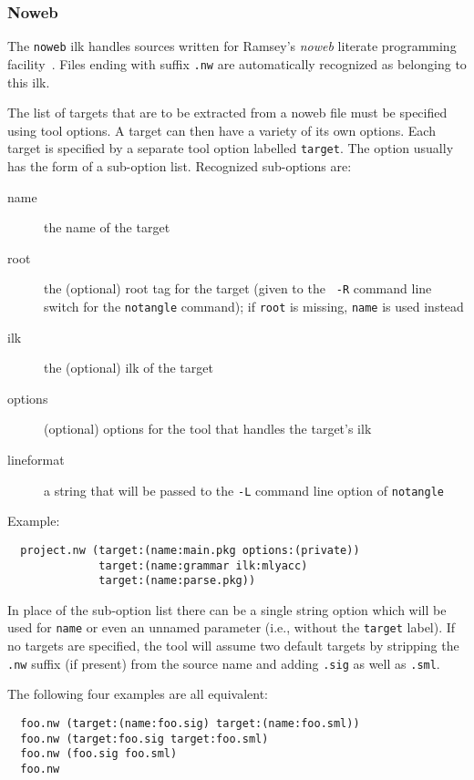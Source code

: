 \subsubsection{Noweb}
\label{sec:builtin-tools:noweb}

The {\tt noweb} ilk handles sources written for Ramsey's {\it noweb}
literate programming facility~\cite{ramsey:simplified}.  Files ending
with suffix {\tt .nw} are automatically recognized as belonging to
this ilk.

The list of targets that are to be extracted from a noweb file must be
specified using tool options.  A target can then have a variety of its
own options.  Each target is specified by a separate tool option
labelled {\tt target}.  The option usually has the form of a
sub-option list.  Recognized sub-options are:

\begin{description}
\item[name] the name of the target
\item[root] the (optional) root tag for the target (given to the {\tt
-R} command line switch for the {\tt notangle} command); if {\tt root}
is missing, {\tt name} is used instead
\item[ilk] the (optional) ilk of the target
\item[options] (optional) options for the tool that handles the
target's ilk
\item[lineformat] a string that will be passed to the {\tt -L} command
line option of {\tt notangle}
\end{description}

Example:

\begin{verbatim}
  project.nw (target:(name:main.pkg options:(private))
              target:(name:grammar ilk:mlyacc)
              target:(name:parse.pkg))
\end{verbatim}

In place of the sub-option list there can be a single string option
which will be used for {\tt name} or even an unnamed parameter (i.e.,
without the {\tt target} label).  If no targets are specified, the
tool will assume two default targets by stripping the {\tt .nw}
suffix (if present) from the source name and adding {\tt .sig} as well
as {\tt .sml}.

The following four examples are all equivalent:

\begin{verbatim}
  foo.nw (target:(name:foo.sig) target:(name:foo.sml))
  foo.nw (target:foo.sig target:foo.sml)
  foo.nw (foo.sig foo.sml)
  foo.nw
\end{verbatim}

